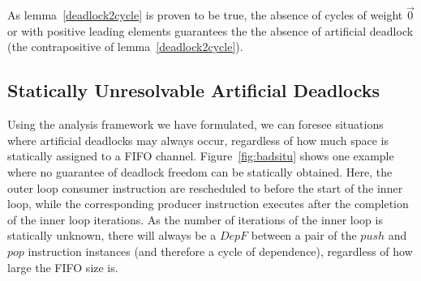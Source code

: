 As lemma~\ref{deadlock2cycle} is proven to be true, the absence of cycles of
weight $\vec{0}$ or with positive leading elements guarantees the the absence of artificial deadlock (the contrapositive of lemma~\ref{deadlock2cycle}).

\subsection{Statically Unresolvable Artificial Deadlocks}
Using the analysis framework we have formulated, we can foresee situations
where artificial deadlocks may always occur, regardless of how much
space is statically assigned to a FIFO channel. Figure~\ref{fig:badsitu}
shows one example where no guarantee of deadlock freedom can be
statically obtained. 
Here, the outer loop consumer instruction
are rescheduled to before the start of the inner loop, while the corresponding producer instruction
executes after the completion of the inner loop iterations. As the
number of iterations of the inner loop is statically unknown, there will
always be a $DepF$ between a pair of the $push$ and $pop$ instruction instances (and therefore a cycle of dependence),
regardless of how large the FIFO size is. 


